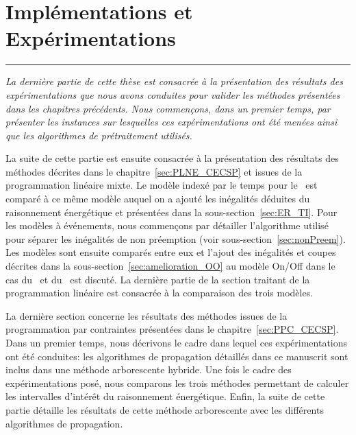 \cleardoublepage
\begin{minipage}{0.95\linewidth}

\part{Implémentations et Expérimentations}
\vspace{15mm} %
\parttoc 
\end{minipage}
\newpage
\thispagestyle{empty}
\begin{center}
  \begin{minipage}{\textwidth}
    \hrule
    \vspace{0.5cm}
    {\it  La dernière partie de cette thèse est consacrée à la
      présentation des résultats des expérimentations que nous avons
      conduites pour valider les méthodes présentées dans les
      chapitres précédents. Nous commençons, dans un premier temps,
      par présenter les instances sur lesquelles ces expérimentations
      ont été menées ainsi que les algorithmes de prétraitement
      utilisés. 

      La suite de cette partie est ensuite consacrée à la présentation
des résultats des méthodes décrites dans le
chapitre~\ref{sec:PLNE_CECSP} et issues de la programmation linéaire
mixte. Le modèle indexé par le temps pour le \CECSP~est comparé à ce
même modèle auquel on a ajouté les inégalités déduites du raisonnement
énergétique et présentées dans la sous-section~\ref{sec:ER_TI}. Pour
les modèles à événements, nous commençons par détailler l'algorithme
utilisé pour séparer les inégalités de non préemption (voir
sous-section~\ref{sec:nonPreem}). Les modèles sont ensuite comparés
entre eux et l'ajout des inégalités et coupes décrites dans la
sous-section~\ref{sec:amelioration_OO} au modèle On/Off dans le cas du
\CECSP~et du \RCPSP~est discuté. La dernière partie de la section 
traitant de la programmation linéaire est consacrée à la comparaison
des trois modèles.

      La dernière section concerne les résultats des méthodes issues de
      la programmation par contraintes présentées dans le
      chapitre~\ref{sec:PPC_CECSP}. Dans un premier temps, nous
      décrivons le cadre dans lequel ces expérimentations ont été
      conduites: les algorithmes de propagation détaillés dans ce manuscrit
      sont inclus dans une méthode arborescente hybride. Une fois le cadre
      des expérimentations posé, nous comparons les trois méthodes permettant
      de calculer les intervalles d'intérêt du raisonnement
      énergétique. Enfin, la suite de cette partie détaille les résultats de
      cette méthode arborescente avec les différents algorithmes de
      propagation. 

}
\end{minipage}
\end{center}

